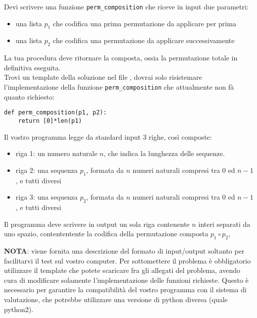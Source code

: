\begin{minipage}[c]{.50\textwidth}

\end{minipage}

\medskip

Devi scrivere una funzione {\tt perm\_composition} che riceve in input due parametri: 
\begin{itemize}
\item una lista $p_1$ che codifica una prima permutazione da applicare per prima
\item una lista $p_2$ che codifica una permutazione da applicare successivamente
\end{itemize}
La tua procedura deve ritornare la composta, ossia la permutazione totale in definitiva eseguita. \\

Trovi un template della soluzione nel file \textbf{}, 
dovrai solo risistemare l'implementazione della funzione {\tt perm\_composition}
che attualmente non fà quanto richiesto: 

\begin{verbatim}
def perm_composition(p1, p2):
    return [0]*len(p1)
\end{verbatim}

\InputFile
Il vostro programma legge da standard input 3 righe, così composte:
\begin{itemize}
\item riga 1: un numero naturale $n$, che indica la lunghezza delle sequenze. 
\item riga 2: una sequenza $p_1$, formata da $n$ numeri naturali compresi tra $0$ ed $n-1$, e tutti diversi
\item riga 3: una sequenza $p_2$, formata da $n$ numeri naturali compresi tra $0$ ed $n-1$, e tutti diversi
\end{itemize}

\OutputFile
Il programma deve scrivere in output un sola riga contenente $n$ interi separati 
da uno spazio, contententente la codifica della permutazione composta $p_1\circ p_2$, 

\textbf{NOTA}: viene fornita una descrizione del formato di input/output soltanto 
per facilitarvi il test sul vostro computer. Per sottomettere il problema è obbligatorio 
utilizzare il template che potete scaricare fra gli allegati del problema, avendo 
cura di modificare solamente l'implementazione delle funzioni richieste. Questo 
è necessario per garantire la compatibilità del vostro programma con il sistema 
di valutazione, che potrebbe utilizzare una versione di python diversa (quale python2).

